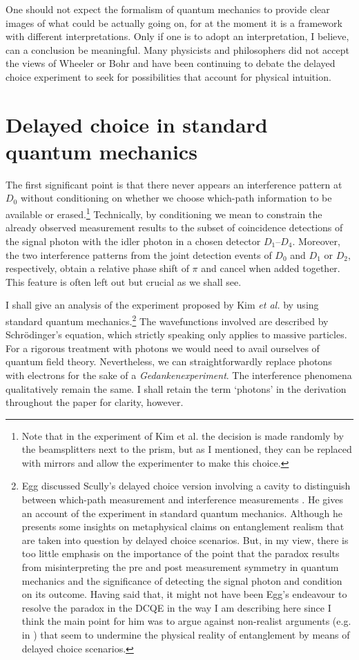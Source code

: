 \documentclass[12pt]{article}
\numberwithin{equation}{section}
\begin{document}
One should not expect the formalism of quantum mechanics to provide clear images of what could be actually going on, for at the moment it is a framework with different interpretations. Only if one is to adopt an interpretation, I believe, can a conclusion be meaningful. Many physicists and philosophers did not accept the views of Wheeler or Bohr and have been continuing to debate the delayed choice experiment to seek for possibilities that account for physical intuition. 

\section{Delayed choice in standard quantum mechanics}

The first significant point is that there never appears an interference pattern at $D_0$ without conditioning on whether we choose which-path information to be available or erased.\footnote{Note that in the experiment of Kim et al. the decision is made randomly by the beamsplitters next to the prism, but as I mentioned, they can be replaced with mirrors and allow the experimenter to make this choice.} Technically, by conditioning we mean to constrain the already observed measurement results to the subset of coincidence detections of the signal photon with the idler photon in a chosen detector $D_1$--$D_4$.  Moreover,  the two interference patterns from the joint detection events of $D_0$ and $D_1$ or $D_2$, respectively, obtain a relative phase shift of $\pi$ and cancel when added together. This feature is often left out but crucial as we shall see.    

I shall give an analysis of the experiment proposed by Kim \textit{et al.} by using standard quantum mechanics.\footnote{Egg discussed Scully's delayed choice version involving a cavity to distinguish between which-path measurement and interference measurements \cite{Egg2013}. He gives an account of the experiment in standard quantum mechanics. Although he presents some insights on metaphysical claims on entanglement realism that are taken into question by delayed choice scenarios. But, in my view, there is too little emphasis on the importance of the point that the paradox results from misinterpreting the pre and post measurement symmetry in quantum mechanics and the significance of detecting the signal photon and condition on its outcome. Having said that, it might not have been Egg's endeavour to resolve the paradox in the DCQE in the way I am describing here since I think the main point for him was to argue against non-realist arguments (e.g. in \cite{healey2012quantum}) that seem to undermine the physical reality of entanglement by means of delayed choice scenarios.} The wavefunctions involved are described by Schrödinger's equation, which strictly speaking only applies to massive particles. For a rigorous treatment with photons we would need to avail ourselves of quantum field theory. Nevertheless, we can straightforwardly replace photons with electrons for the sake of a \textit{Gedankenexperiment}. The interference phenomena qualitatively remain the same. I shall retain the term `photons' in the derivation throughout the paper for clarity, however. 
\end{document}
